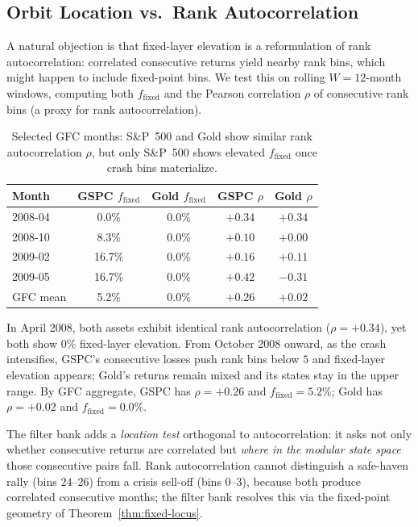 \subsection{Orbit Location vs.\ Rank Autocorrelation}
\label{sec:orbit-vs-ac}

A natural objection is that fixed-layer elevation is a reformulation of
rank autocorrelation: correlated consecutive returns yield nearby rank bins,
which might happen to include fixed-point bins.  We test this on rolling
$W = 12$-month windows, computing both $f_\mathrm{fixed}$ and the Pearson
correlation $\rho$ of consecutive rank bins (a proxy for rank
autocorrelation).

\begin{table}[h]
\centering
\caption{Selected GFC months: S\&P~500 and Gold show similar rank
  autocorrelation $\rho$, but only S\&P~500 shows elevated $f_\mathrm{fixed}$
  once crash bins materialize.}
\label{tab:gfc-divergence}
\begin{tabular}{lcccc}
\toprule
Month & GSPC $f_\mathrm{fixed}$ & Gold $f_\mathrm{fixed}$ & GSPC $\rho$ & Gold $\rho$ \\
\midrule
2008-04 & 0.0\%  & 0.0\% & $+0.34$ & $+0.34$ \\
2008-10 & 8.3\%  & 0.0\% & $+0.10$ & $+0.00$ \\
2009-02 & 16.7\% & 0.0\% & $+0.16$ & $+0.11$ \\
2009-05 & 16.7\% & 0.0\% & $+0.42$ & $-0.31$ \\
\midrule
GFC mean & 5.2\% & 0.0\% & $+0.26$ & $+0.02$ \\
\bottomrule
\end{tabular}
\end{table}

In April 2008, both assets exhibit identical rank autocorrelation
($\rho = +0.34$), yet both show $0\%$ fixed-layer elevation.
From October 2008 onward, as the crash intensifies, GSPC's consecutive
losses push rank bins below $5$ and fixed-layer elevation appears; Gold's
returns remain mixed and its states stay in the upper range.  By GFC
aggregate, GSPC has $\rho = +0.26$ and $f_\mathrm{fixed} = 5.2\%$; Gold
has $\rho = +0.02$ and $f_\mathrm{fixed} = 0.0\%$.

The filter bank adds a \emph{location test} orthogonal to autocorrelation:
it asks not only whether consecutive returns are correlated but
\emph{where in the modular state space} those consecutive pairs fall.
Rank autocorrelation cannot distinguish a safe-haven rally (bins $24$--$26$)
from a crisis sell-off (bins $0$--$3$), because both produce correlated
consecutive months; the filter bank resolves this via the fixed-point
geometry of Theorem~\ref{thm:fixed-locus}.

